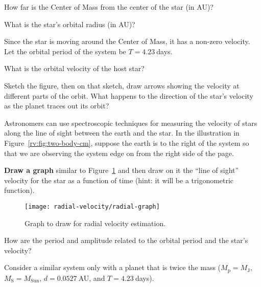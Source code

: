 \begin{steps}
	\item How far is the Center of Mass from the center of the star (in AU)?
	
	\item What is the star’s orbital radius (in AU)?
\end{steps}

Since the star is moving around the Center of Mass, it has a non-zero velocity. Let the orbital period of the system be $T = 4.23\:$days.

\begin{steps}
	\item What is the orbital velocity of the host star?
	
	\item Sketch the figure, then on that sketch, draw arrows showing the velocity at different parts of the orbit. What happens to the direction of the star’s velocity as the planet traces out its orbit?
\end{steps}

Astronomers can use spectroscopic techniques for measuring the velocity of stars along the line of sight between the earth and the star. In the illustration in Figure~\ref{rv:fig:two-body-cm}, suppose the earth is to the right of the system so that we are observing the system edge on from the right side of the page. 

\begin{steps}
	\item \textbf{Draw a graph} similar to Figure~\ref{rv:fig:graph} and then draw on it the ``line of sight'' velocity for the star as a function of time (hint: it will be a trigonometric function).
\end{steps}

\begin{figure}
	\centering
	\texttt{[image: radial-velocity/radial-graph]}
	\caption{Graph to draw for radial velocity estimation.}\label{rv:fig:graph}
\end{figure}

\begin{steps}
	\item How are the period and amplitude related to the orbital period and the star’s velocity?
\end{steps}

Consider a similar system only with a planet that is twice the mass ($M_\textrm{p} = M_\textrm{J}$, $M_\textrm{S} = M_\textrm{Sun}$, $d = 0.0527\:$AU, and $T = 4.23\:$days).

